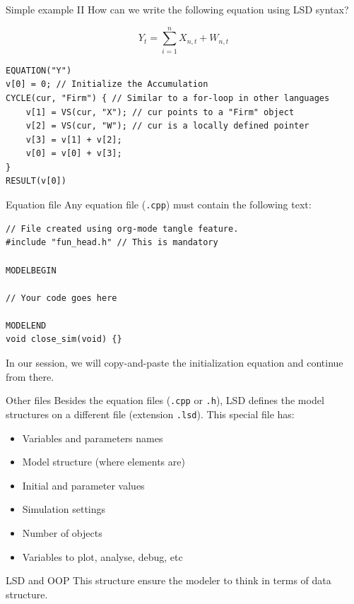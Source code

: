 \documentclass[bigger,aspectratio=169]{beamer}
\begin{document}
\begin{frame}[label={sec:orga1e118b},fragile]{Simple example II}
 How can we write the following equation using LSD syntax?

\[Y_{t} = \sum_{i=1}^{n} X_{n,t} + W_{n,t}\]


\begin{verbatim}
EQUATION("Y")
v[0] = 0; // Initialize the Accumulation
CYCLE(cur, "Firm") { // Similar to a for-loop in other languages
    v[1] = VS(cur, "X"); // cur points to a "Firm" object
    v[2] = VS(cur, "W"); // cur is a locally defined pointer
    v[3] = v[1] + v[2];
    v[0] = v[0] + v[3];
}
RESULT(v[0])
\end{verbatim}
\end{frame}
\begin{frame}[label={sec:org94d33d3},fragile]{Equation file}
 Any equation file (\texttt{.cpp}) must contain the following text:
\begin{verbatim}
// File created using org-mode tangle feature.
#include "fun_head.h" // This is mandatory

MODELBEGIN

// Your code goes here

MODELEND
void close_sim(void) {}
\end{verbatim}

In our session, we will copy-and-paste the initialization equation and continue from there.
\end{frame}
\begin{frame}[label={sec:org459268b},fragile]{Other files}
 Besides the equation files (\texttt{.cpp} or \texttt{.h}), LSD defines the model structures on a different file (extension \texttt{.lsd}).
This special file has:

\begin{itemize}
\item Variables and parameters names
\item Model structure (where elements are)
\item Initial and parameter values
\item Simulation settings
\item Number of objects
\item Variables to plot, analyse, debug, etc
\end{itemize}
\begin{block}{LSD and OOP}
This structure ensure the modeler to think in terms of data structure.
\end{block}
\end{frame}
\end{document}
